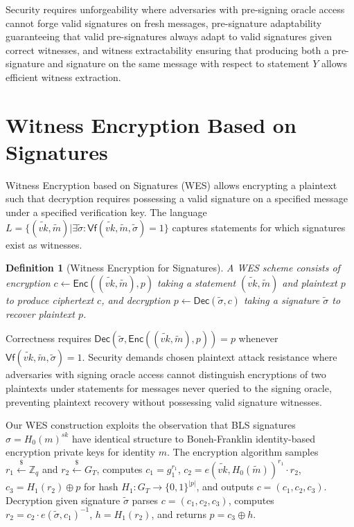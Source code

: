\documentclass[11pt,a4paper]{article}
\newtheorem{definition}[theorem]{Definition}
\newcommand{\ZZ}{\mathbb{Z}}
\newcommand{\Enc}{\textsf{Enc}}
\newcommand{\Dec}{\textsf{Dec}}
\newcommand{\Vf}{\textsf{Vf}}
\begin{document}
{Security requires unforgeability where adversaries with pre-signing oracle access cannot forge valid signatures on fresh messages, pre-signature adaptability guaranteeing that valid pre-signatures always adapt to valid signatures given correct witnesses, and witness extractability ensuring that producing both a pre-signature and signature on the same message with respect to statement $Y$ allows efficient witness extraction.

\section{Witness Encryption Based on Signatures}

Witness Encryption based on Signatures (WES) allows encrypting a plaintext such that decryption requires possessing a valid signature on a specified message under a specified verification key. The language $L = \{(\tilde{vk}, \tilde{m}) | \exists \tilde{\sigma} : \Vf(\tilde{vk}, \tilde{m}, \tilde{\sigma}) = 1\}$ captures statements for which signatures exist as witnesses.

\begin{definition}[Witness Encryption for Signatures]
A WES scheme consists of encryption $c \leftarrow \Enc((\tilde{vk}, \tilde{m}), p)$ taking a statement $(\tilde{vk}, \tilde{m})$ and plaintext $p$ to produce ciphertext $c$, and decryption $p \leftarrow \Dec(\tilde{\sigma}, c)$ taking a signature $\tilde{\sigma}$ to recover plaintext $p$.
\end{definition}

Correctness requires $\Dec(\tilde{\sigma}, \Enc((\tilde{vk}, \tilde{m}), p)) = p$ whenever $\Vf(\tilde{vk}, \tilde{m}, \tilde{\sigma}) = 1$. Security demands chosen plaintext attack resistance where adversaries with signing oracle access cannot distinguish encryptions of two plaintexts under statements for messages never queried to the signing oracle, preventing plaintext recovery without possessing valid signature witnesses.

Our WES construction exploits the observation that BLS signatures $\sigma = H_0(m)^{sk}$ have identical structure to Boneh-Franklin identity-based encryption private keys for identity $m$. The encryption algorithm samples $r_1 \xleftarrow{\$} \ZZ_q$ and $r_2 \xleftarrow{\$} G_T$, computes $c_1 = g_1^{r_1}$, $c_2 = e(\tilde{vk}, H_0(\tilde{m}))^{r_1} \cdot r_2$, $c_3 = H_1(r_2) \oplus p$ for hash $H_1: G_T \to \{0,1\}^{|p|}$, and outputs $c = (c_1, c_2, c_3)$. Decryption given signature $\tilde{\sigma}$ parses $c = (c_1, c_2, c_3)$, computes $r_2 = c_2 \cdot e(\tilde{\sigma}, c_1)^{-1}$, $h = H_1(r_2)$, and returns $p = c_3 \oplus h$.

}
\end{document}
